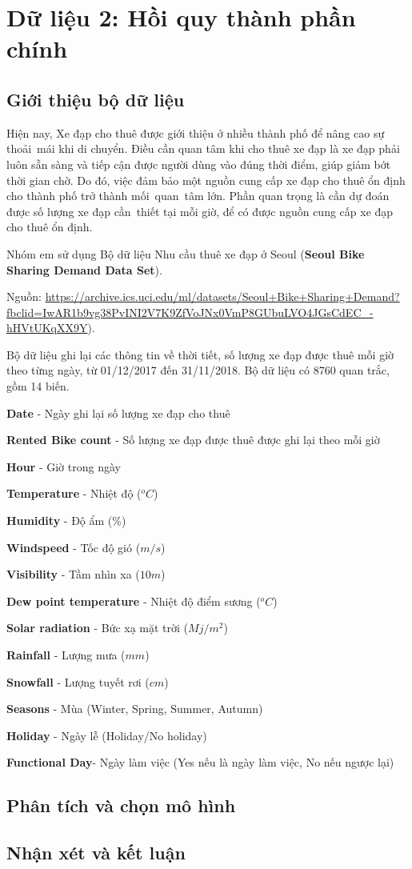 \section{Dữ liệu 2: Hồi quy thành phần chính}

\subsection{Giới thiệu bộ dữ liệu}
Hiện nay, Xe đạp cho thuê được giới thiệu ở nhiều thành phố để nâng cao sự thoải~mái khi di chuyển. Điều cần quan tâm khi cho thuê xe đạp là xe đạp phải luôn sẵn sàng và tiếp cận được người dùng vào đúng thời điểm, giúp giảm bớt thời gian chờ. Do đó, việc đảm bảo  một nguồn cung cấp xe đạp cho thuê ổn định cho thành phố trở thành mối~quan~tâm lớn. Phần quan trọng là cần dự đoán được số lượng xe đạp cần~thiết tại mỗi giờ, để có được nguồn cung cấp xe đạp cho thuê ổn định.

Nhóm em sử dụng Bộ dữ liệu Nhu cầu thuê xe đạp ở Seoul (\textbf{Seoul Bike Sharing Demand Data Set}).

Nguồn: \url{https://archive.ics.uci.edu/ml/datasets/Seoul+Bike+Sharing+Demand?fbclid=IwAR1b9vg38PvINI2V7K9ZfVoJNx0VmP8GUbuLVO4JGsCdEC\_-hHVtUKqXX9Y}).

Bộ dữ liệu ghi lại các thông tin về thời tiết, số lượng xe đạp được thuê mỗi giờ theo từng ngày, từ 01/12/2017 đến 31/11/2018. Bộ dữ liệu có 8760 quan trắc, gồm 14 biến.

\textbf{Date} - Ngày ghi lại số lượng xe đạp cho thuê

\textbf{Rented Bike count} - Số lượng xe đạp được thuê được ghi lại theo mỗi giờ

\textbf{Hour} - Giờ trong ngày

\textbf{Temperature} - Nhiệt độ ($^o C$)

\textbf{Humidity} - Độ ẩm (\%)

\textbf{Windspeed} - Tốc độ gió ($m/s$)

\textbf{Visibility} - Tầm nhìn xa ($10m$)

\textbf{Dew point temperature} - Nhiệt độ điểm sương ($^o C$)

\textbf{Solar radiation} - Bức xạ mặt trời ($Mj/m^2$)

\textbf{Rainfall} - Lượng mưa ($mm$)

\textbf{Snowfall} - Lượng tuyết rơi ($cm$)

\textbf{Seasons} - Mùa (Winter, Spring, Summer, Autumn)

\textbf{Holiday} - Ngày lễ (Holiday/No holiday)

\textbf{Functional Day}- Ngày làm việc (Yes nếu là ngày làm việc, No nếu ngược lại)

\subsection*{Phân tích và chọn mô hình}

\subsection*{Nhận xét và kết luận}